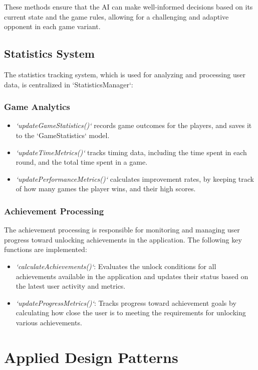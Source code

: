 These methods ensure that the AI can make well-informed decisions based on its current state and the game rules, allowing for a challenging and adaptive opponent in each game variant.
    

\subsection{Statistics System}
The statistics tracking system, which is used for analyzing and processing user data, is centralized in `StatisticsManager`:

\subsubsection{Game Analytics}
    \begin{itemize}
        \item \textit{`updateGameStatistics()`} records game outcomes for the players, and saves it to the `GameStatistics` model.
        \item \textit{`updateTimeMetrics()`} tracks timing data, including the time spent in each round, and the total time spent in a game.
        \item \textit{`updatePerformanceMetrics()`} calculates improvement rates, by keeping track of how many games the player wins, and their high scores.
    \end{itemize}

\subsubsection{Achievement Processing}
The achievement processing is responsible for monitoring and managing user progress toward unlocking achievements in the application. The following key functions are implemented:
    \begin{itemize}
        \item \textit{`calculateAchievements()`}: Evaluates the unlock conditions for all achievements available in the application and updates their status based on the latest user activity and metrics.
        \item \textit{`updateProgressMetrics()`}: Tracks progress toward achievement goals by calculating how close the user is to meeting the requirements for unlocking various achievements.
    \end{itemize}
    
\section{Applied Design Patterns}

